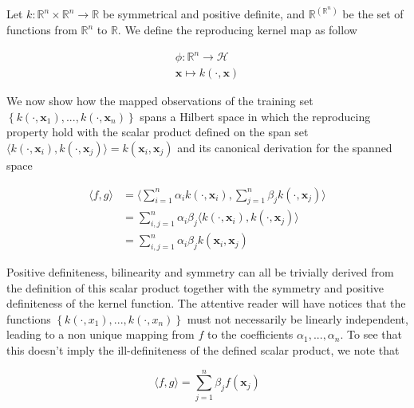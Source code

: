 Let $k : \mathbb{R}^n \times \mathbb{R}^n \rightarrow \mathbb{R}$ be symmetrical and positive definite, and $\mathbb{R}^{(\mathbb{R}^n)}$ be the set of functions from $\mathbb{R}^n$ to $\mathbb{R}$. We define the reproducing kernel map as follow

\begin{equation}
  \begin{aligned}
    \phi : \mathbb{R}^n \rightarrow \mathcal{H}\\
    \mathbf{x} \mapsto k(\cdot, \mathbf{x})
  \end{aligned}
\end{equation}

We now show how the mapped observations of the training set $\left\{k\left(\cdot, \mathbf{x}_1\right), ..., k\left(\cdot, \mathbf{x}_n\right)\right\}$ spans a Hilbert space in which the reproducing property hold with the scalar product defined on the span set $\langle k\left(\cdot, \mathbf{x}_i\right), k\left(\cdot, \mathbf{x}_j\right)\rangle = k\left(\mathbf{x}_i, \mathbf{x}_j\right)$ and its canonical derivation for the spanned space

\begin{equation*}
  \begin{aligned}
    \langle f, g\rangle 
    &= \langle \sum_{i=1}^n\alpha_ik(\cdot, \mathbf{x}_i), \sum_{j=1}^n\beta_jk(\cdot, \mathbf{x}_j)\rangle \\
    &= \sum_{i,j=1}^n\alpha_i\beta_j \langle k\left(\cdot, \mathbf{x}_i\right), k\left(\cdot, \mathbf{x}_j\right)\rangle \\
    &= \sum_{i,j=1}^n\alpha_i\beta_j k\left(\mathbf{x}_i, \mathbf{x}_j\right)
  \end{aligned}
\end{equation*}

Positive definiteness, bilinearity and symmetry can all be trivially derived from the definition of this scalar product together with the symmetry and positive definiteness of the kernel function. The attentive reader will have notices that the functions $\left\{k\left(\cdot, x_1\right), ..., k\left(\cdot, x_n\right)\right\}$ must not necessarily be linearly independent, leading to a non unique mapping from $f$ to the coefficients $\alpha_1, ..., \alpha_n$. To see that this doesn't imply the ill-definiteness of the defined scalar product, we note that

\begin{equation*}
  \langle f, g\rangle = \sum_{j=1}^n\beta_j f\left(\mathbf{x}_j\right)
\end{equation*}

